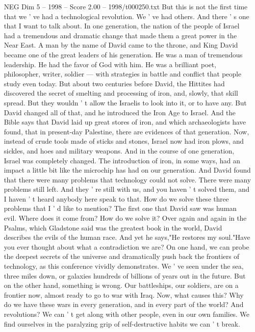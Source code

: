 \begin{textsample}{NEG Dim 5 – 1998 – Score 2.00 – 1998/t000250.txt}
But this is not the first time that we ' ve had a technological revolution.
We ' ve had others.
And there ' s one that I want to talk about.
In one generation, the nation of the people of Israel had a tremendous and dramatic change that made them a great power in the Near East.
A man by the name of David came to the throne, and King David became one of the great leaders of his generation.
He was a man of tremendous leadership.
He had the favor of God with him.
He was a brilliant poet, philosopher, writer, soldier — with strategies in battle and conflict that people study even today.
But about two centuries before David, the Hittites had discovered the secret of smelting and processing of iron, and, slowly, that skill spread.
But they wouldn ' t allow the Israelis to look into it, or to have any.
But David changed all of that, and he introduced the Iron Age to Israel.
And the Bible says that David laid up great stores of iron, and which archaeologists have found, that in present-day Palestine, there are evidences of that generation.
Now, instead of crude tools made of sticks and stones, Israel now had iron plows, and sickles, and hoes and military weapons.
And in the course of one generation, Israel was completely changed.
The introduction of iron, in some ways, had an impact a little bit like the microchip has had on our generation.
And David found that there were many problems that technology could not solve.
There were many problems still left.
And they ' re still with us, and you haven ' t solved them, and I haven ' t heard anybody here speak to that.
How do we solve these three problems that I ' d like to mention?
The first one that David saw was human evil.
Where does it come from?
How do we solve it?
Over again and again in the Psalms, which Gladstone said was the greatest book in the world, David describes the evils of the human race.
And yet he says,"He restores my soul."Have you ever thought about what a contradiction we are?
On one hand, we can probe the deepest secrets of the universe and dramatically push back the frontiers of technology, as this conference vividly demonstrates.
We ' ve seen under the sea, three miles down, or galaxies hundreds of billions of years out in the future.
But on the other hand, something is wrong.
Our battleships, our soldiers, are on a frontier now, almost ready to go to war with Iraq.
Now, what causes this?
Why do we have these wars in every generation, and in every part of the world?
And revolutions?
We can ' t get along with other people, even in our own families.
We find ourselves in the paralyzing grip of self-destructive habits we can ' t break.

\end{textsample}
